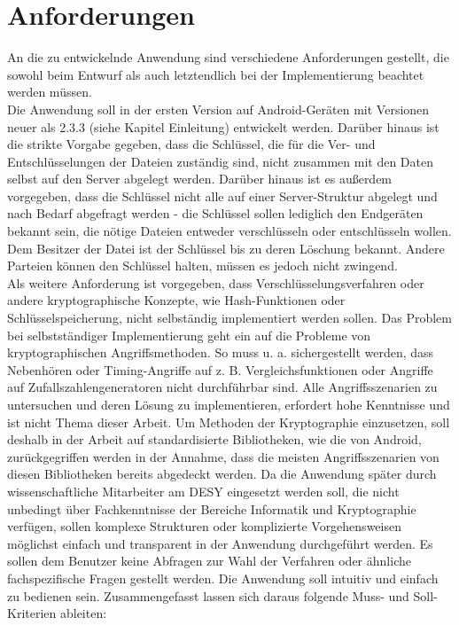 \documentclass[10pt, a4paper,headsepline,pointednumbers]{scrreprt}
\begin{document}
\section{Anforderungen}
An die zu entwickelnde Anwendung sind verschiedene Anforderungen gestellt, die sowohl beim Entwurf als auch letztendlich bei der Implementierung beachtet werden müssen. \\
Die Anwendung soll in der ersten Version auf Android-Geräten mit Versionen neuer als 2.3.3 (siehe Kapitel Einleitung) entwickelt werden. Darüber hinaus ist die strikte Vorgabe gegeben, dass die Schlüssel, die für die Ver- und Entschlüsselungen der Dateien zuständig sind, nicht zusammen mit den Daten selbst auf den Server abgelegt werden. Darüber hinaus ist es außerdem vorgegeben, dass die Schlüssel nicht alle auf einer Server-Struktur abgelegt und nach Bedarf abgefragt werden - die Schlüssel sollen lediglich den Endgeräten bekannt sein, die nötige Dateien entweder verschlüsseln oder entschlüsseln wollen. Dem Besitzer der Datei ist der Schlüssel bis zu deren Löschung bekannt. Andere Parteien können den Schlüssel halten, müssen es jedoch nicht zwingend. \\
Als weitere Anforderung ist vorgegeben, dass Verschlüsselungsverfahren oder andere kryptographische Konzepte, wie Hash-Funktionen oder Schlüsselspeicherung, nicht selbständig implementiert werden sollen. Das Problem bei selbstständiger Implementierung geht ein auf die Probleme von kryptographischen Angriffsmethoden. So muss u. a. sichergestellt werden, dass Nebenhören oder Timing-Angriffe auf z. B. Vergleichsfunktionen oder Angriffe auf Zufallszahlengeneratoren nicht durchführbar sind. Alle Angriffsszenarien zu untersuchen und deren Lösung zu implementieren, erfordert hohe Kenntnisse und ist nicht Thema dieser Arbeit. Um Methoden der Kryptographie einzusetzen, soll deshalb in der Arbeit auf standardisierte Bibliotheken, wie die von Android, zurückgegriffen werden in der Annahme, dass die meisten Angriffsszenarien von diesen Bibliotheken bereits abgedeckt werden. Da die Anwendung später durch wissenschaftliche Mitarbeiter am DESY eingesetzt werden soll, die nicht unbedingt über Fachkenntnisse der Bereiche Informatik und Kryptographie verfügen, sollen komplexe Strukturen oder komplizierte Vorgehensweisen möglichst einfach und transparent in der Anwendung durchgeführt werden. Es sollen dem Benutzer keine Abfragen zur Wahl der Verfahren oder ähnliche fachspezifische Fragen gestellt werden. Die Anwendung soll intuitiv und einfach zu bedienen sein. Zusammengefasst lassen sich daraus folgende Muss- und Soll-Kriterien ableiten: \\ \\ \\
\end{document}
